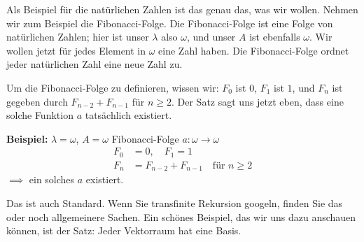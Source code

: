 \begin{spoken-clean}[00:33:40 - 00:36:40]
Als Beispiel für die natürlichen Zahlen ist das genau das, was wir wollen. Nehmen wir zum Beispiel die Fibonacci-Folge. Die Fibonacci-Folge ist eine Folge von natürlichen Zahlen; hier ist unser $\lambda$ also $\omega$, und unser $A$ ist ebenfalls $\omega$. Wir wollen jetzt für jedes Element in $\omega$ eine Zahl haben. Die Fibonacci-Folge ordnet jeder natürlichen Zahl eine neue Zahl zu.

Um die Fibonacci-Folge zu definieren, wissen wir: $F_0$ ist $0$, $F_1$ ist $1$, und $F_n$ ist gegeben durch $F_{n-2} + F_{n-1}$ für $n \ge 2$. Der Satz sagt uns jetzt eben, dass eine solche Funktion $a$ tatsächlich existiert.
\end{spoken-clean}

\begin{math-stroke}
\textbf{Beispiel:} $\lambda = \omega$, $A = \omega$
Fibonacci-Folge
$a: \omega \to \omega$
\begin{align*}
F_0 &= 0, \quad F_1 = 1 \\
F_n &= F_{n-2} + F_{n-1} \quad \text{für } n \ge 2
\end{align*}
$\implies$ ein solches $a$ existiert.
\end{math-stroke}

\begin{ai-global-state-checkpoint-invisible-content}
\end{ai-global-state-checkpoint-invisible-content}

\begin{spoken-clean}[00:36:40 - 00:36:55]
Das ist auch Standard. Wenn Sie transfinite Rekursion googeln, finden Sie das oder noch allgemeinere Sachen. Ein schönes Beispiel, das wir uns dazu anschauen können, ist der Satz: Jeder Vektorraum hat eine Basis.
\end{spoken-clean}

